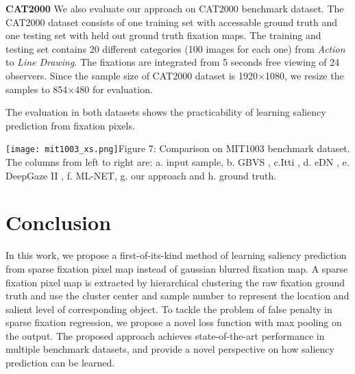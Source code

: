 \documentclass[letterpaper, 10 pt, conference]{ieeeconf}  %
\begin{document}
\par \textbf{CAT2000} We also evaluate our approach on CAT2000 \cite{b24} benchmark dataset. The CAT2000 dataset consists of one training set with accessable ground truth and one testing set with held out ground truth fixation maps. The training and testing set contains 20 different categories (100 images for each one) from \emph{Action} to \emph{Line Drawing}. The fixations are integrated from 5 seconds free viewing of 24 observers. Since the sample size of CAT2000 dataset is 1920$\times$1080, we resize the samples to 854$\times$480 for evaluation.

\par The evaluation in both datasets shows the practicability of learning saliency prediction from fixation pixels.

\begin{figure*}
\centering
    \texttt{[image: mit1003\_xs.png]}{Figure 7: Comparison on MIT1003 benchmark dataset. The columns from left to right are: a. input sample, b. GBVS \cite{b39}, c.Itti \cite{b44}, d. eDN \cite{b15}, e. DeepGaze II \cite{b18}, f. ML-NET\cite{b45}, g. our approach and h. ground truth.
    \label{fig7}}
\end{figure*}

\section{Conclusion}

\par In this work, we propose a first-of-its-kind method of learning saliency prediction from sparse fixation pixel map instead of gaussian blurred fixation map. A sparse fixation pixel map is extracted by hierarchical clustering the raw fixation ground truth and use the cluster center and sample number to represent the location and salient level of corresponding object. To tackle the problem of false penalty in sparse fixation regression, we propose a novel loss function with max pooling on the output. The proposed approach achieves state-of-the-art performance in multiple benchmark datasets, and provide a novel perspective on how saliency prediction can be learned.
\end{document}
